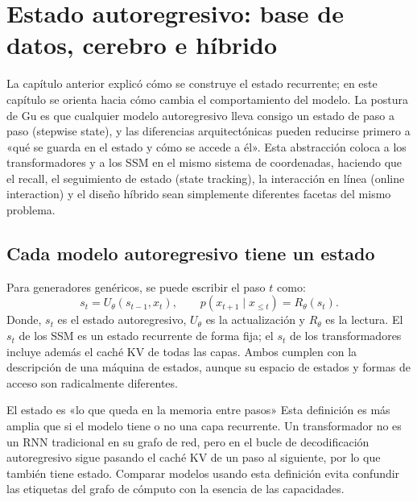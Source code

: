 \section{Estado autoregresivo: base de datos, cerebro e híbrido}

La capítulo anterior explicó cómo se construye el estado recurrente; en este capítulo se orienta hacia cómo cambia el comportamiento del modelo. La postura de Gu es que cualquier modelo autoregresivo lleva consigo un estado de paso a paso (stepwise state), y las diferencias arquitectónicas pueden reducirse primero a «qué se guarda en el estado y cómo se accede a él». Esta abstracción coloca a los transformadores y a los SSM en el mismo sistema de coordenadas, haciendo que el recall, el seguimiento de estado (state tracking), la interacción en línea (online interaction) y el diseño híbrido sean simplemente diferentes facetas del mismo problema.

\subsection{Cada modelo autoregresivo tiene un estado}

Para generadores genéricos, se puede escribir el paso $t$ como:
\[
s_t=U_\theta(s_{t-1},x_t),
\qquad
p(x_{t+1}\mid x_{\le t})=R_\theta(s_t).
\]
Donde, $s_t$ es el estado autoregresivo, $U_\theta$ es la actualización y $R_\theta$ es la lectura. El $s_t$ de los SSM es un estado recurrente de forma fija; el $s_t$ de los transformadores incluye además el caché KV de todas las capas. Ambos cumplen con la descripción de una máquina de estados, aunque su espacio de estados y formas de acceso son radicalmente diferentes.


\begin{importantbox}{El estado es «lo que queda en la memoria entre pasos»}
Esta definición es más amplia que si el modelo tiene o no una capa recurrente. Un transformador no es un RNN tradicional en su grafo de red, pero en el bucle de decodificación autoregresivo sigue pasando el caché KV de un paso al siguiente, por lo que también tiene estado. Comparar modelos usando esta definición evita confundir las etiquetas del grafo de cómputo con la esencia de las capacidades.
\end{importantbox}


